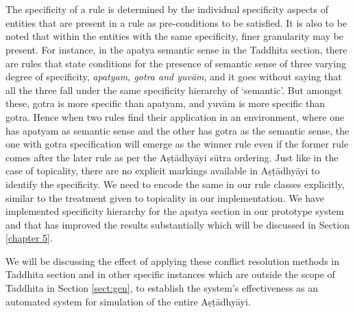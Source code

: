 \documentclass[11pt]{article}
\begin{document}
\\
\\
The specificity of a rule is determined by the individual specificity aspects of entities that are present in a rule as pre-conditions to be satisfied. It is also to be noted that within the entities with the same specificity, finer granularity may be present. For instance, in the apatya semantic sense in the Taddhita section, there are rules that state conditions for the presence of semantic sense of three varying degree of specificity, {\sl apatyam, gotra and yuvām}, and it goes without saying that all the three fall under the same specificity hierarchy of `semantic'. But amongst these, gotra is more specific than apatyam, and yuvām is more specific than gotra. Hence when two rules find their application in an environment, where one has apatyam as semantic sense and the other has gotra as the semantic sense, the one with gotra specification will emerge as the winner rule even if the former rule comes after the later rule as per the Aṣṭādhyāyi sūtra ordering. Just like in the case of topicality, there are no explicit markings available in Aṣṭādhyāyi to identify the specificity. We need to encode the same in our rule classes explicitly, similar to the treatment given to topicality in our implementation. We have implemented specificity hierarchy for the apatya section in our prototype system and that has improved the results substantially which will be discussed in Section \ref{chapter 5}. 


We will be discussing the effect of applying these conflict resolution methods in Taddhita section and in other specific instances which are outside the scope of Taddhita in Section \ref{sect:gen}, to establish the system's effectiveness as an automated system for simulation of the entire Aṣṭādhyāyi.  
\\
\end{document}
